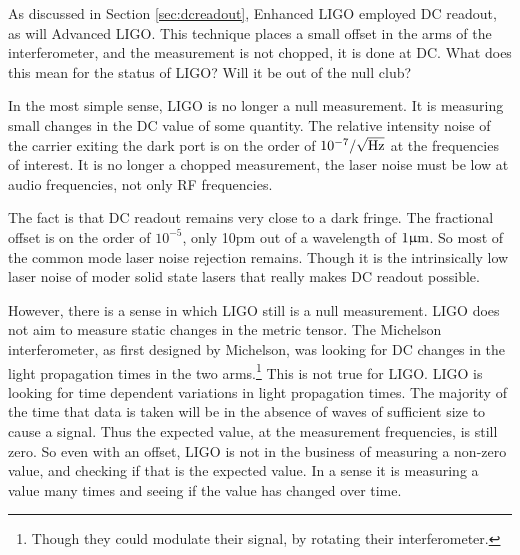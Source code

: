 As discussed in Section \ref{sec:dcreadout}, Enhanced LIGO employed DC readout, as will Advanced LIGO. %
This technique places a small offset in the arms of the interferometer, and the measurement is not chopped, it is done at DC. %
What does this mean for the status of LIGO? %
Will it be out of the null club?

In the most simple sense, LIGO is no longer a null measurement. %
It is measuring small changes in the DC value of some quantity. %
The relative intensity noise of the carrier exiting the dark port is on the order of $10^{-7}/\sqrt{\rm{Hz}}$ at the frequencies of interest. %
It is no longer a chopped measurement, the laser noise must be low at audio frequencies, not only RF frequencies.

The fact is that DC readout remains very close to a dark fringe. %
The fractional offset is on the order of $10^{-5}$, only 10pm out of a wavelength of $1\upmu \rm m$. %
So most of the common mode laser noise rejection remains. %
Though it is the intrinsically low laser noise of moder solid state lasers that really makes DC readout possible.

However, there is a sense in which LIGO still is a null measurement. %
LIGO does not aim to measure static changes in the metric tensor. %
The Michelson interferometer, as first designed by Michelson, was looking for DC changes in the light propagation times in the two arms.\footnote{Though they could modulate their signal, by rotating their interferometer.} This is not true for LIGO. %
LIGO is looking for time dependent variations in light propagation times. %
The majority of the time that data is taken will be in the absence of waves of sufficient size to cause a signal. %
Thus the expected value, at the measurement frequencies, is still zero. %
So even with an offset, LIGO is not in the business of measuring a non-zero value, and checking if that is the expected value. %
In a sense it is measuring a value many times and seeing if the value has changed over time.
